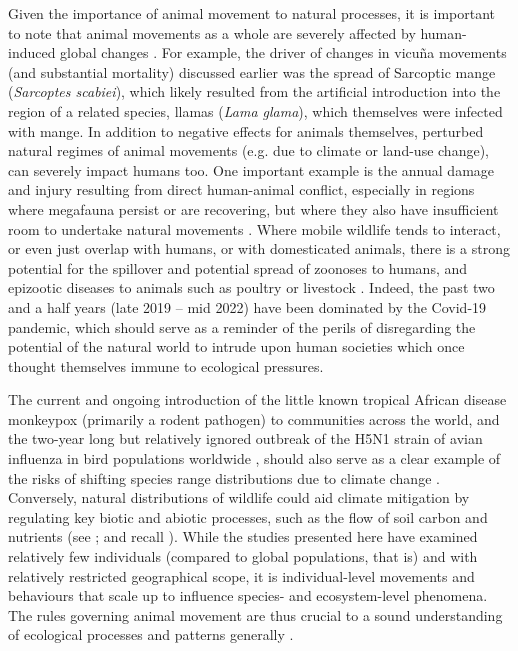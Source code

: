 Given the importance of animal movement to natural processes, it is important to note that animal movements as a whole are severely affected by human-induced global changes \parencite{tucker2018}.
For example, the driver of changes in vicu\~na movements (and substantial mortality) discussed earlier \parencite{monk2022} was the spread of Sarcoptic mange (\emph{Sarcoptes scabiei}), which likely resulted from the artificial introduction into the region of a related species, llamas (\emph{Lama glama}), which themselves were infected with mange.
In addition to negative effects for animals themselves, perturbed natural regimes of animal movements (e.g. due to climate or land-use change), can severely impact humans too.
One important example is the annual damage and injury resulting from direct human-animal conflict, especially in regions where megafauna persist or are recovering, but where they also have insufficient room to undertake natural movements \citep{abrahms2021}.
Where mobile wildlife tends to interact, or even just overlap with humans, or with domesticated animals, there is a strong potential for the spillover and potential spread of zoonoses to humans, and epizootic diseases to animals such as poultry or livestock \citep{carlson2022a,wille2022,keeling2001}.
Indeed, the past two and a half years (late 2019 -- mid 2022) have been dominated by the Covid-19 pandemic, which should serve as a reminder of the perils of disregarding the potential of the natural world to intrude upon human societies which once thought themselves immune to ecological pressures.

The current and ongoing introduction of the little known tropical African disease monkeypox (primarily a rodent pathogen) to communities across the world, and the two-year long but relatively ignored outbreak of the H5N1 strain of avian influenza in bird populations worldwide \parencite{wille2022}, should also serve as a clear example of the risks of shifting species range distributions due to climate change \parencite{carlson2022}.
Conversely, natural distributions of wildlife could aid climate mitigation by regulating key biotic and abiotic processes, such as the flow of soil carbon and nutrients (see \cite{schmitz2018,malhi2022}; and recall \cite{leroux2018}).
While the studies presented here have examined relatively few individuals (compared to global populations, that is) and with relatively restricted geographical scope, it is individual-level movements and behaviours that scale up to influence species- and ecosystem-level phenomena.
The rules governing animal movement are thus crucial to a sound understanding of ecological processes and patterns generally \citep{jeltsch2013,schlagel2020a,costa-pereira2022}.


